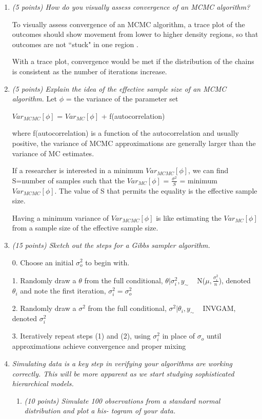 \documentclass{article}\usepackage[]{graphicx}\usepackage[]{color}
\begin{document}
\begin{enumerate}
\item %
{\it (5 points) How do you visually assess convergence of an MCMC algorithm?}

To visually assess convergence of an MCMC algorithm, a trace plot of the outcomes should show movement from lower to higher density regions, so that outcomes are not ``stuck" in one region .

With a trace plot, convergence would be met if the distribution of the chains is consistent as the number of iterations increase.

\item %
{\it (5 points) Explain the idea of the effective sample size of an MCMC algorithm.}
Let $\phi$ = the variance of the parameter set

$Var_{MCMC}[\phi]$ = $Var_{MC}[\phi]$ + f(autocorrelation)

where f(autocorrelation) is a function of the autocorrelation and usually positive, the variance of MCMC approximations are generally larger than the variance of MC estimates.

If a researcher is interested in a minimum $Var_{MCMC}[\phi]$, we can find S=number of samples such that the $Var_{MC}[\phi]$ = $\frac{\sigma^2}{S}$ = minimum $Var_{MCMC}[\phi]$. The value of S that permits the equality is the effective sample size.

Having a minimum variance of $Var_{MCMC}[\phi]$ is like estimating the $Var_{MC}[\phi]$ from a sample size of the effective sample size.

\item %
{\it (15 points) Sketch out the steps for a Gibbs sampler algorithm.}

0. Choose an initial $\sigma_{o}^2$ to begin with.

1. Randomly draw a $\theta$ from the full conditional, $\theta|\sigma^2_{i}, y_{\sim}$ ~ N($\mu, \frac{\sigma_{i}^2}{n}$), denoted $\theta_{i}$ and note the first iteration, $\sigma^2_{i} = \sigma^2_{o}$

2.  Randomly draw a $\sigma^2$ from the full conditional, $\sigma^2|\theta_{i}, y_{\sim}$ ~ INVGAM, denoted $\sigma^2_{i}$

3. Iteratively repeat steps (1) and (2), using $\sigma^2_{i}$ in place of $\sigma_{o}$ until approximations achieve convergence and proper mixing

\item %
{\it Simulating data is a key step in verifying your algorithms are working correctly. This will be
more apparent as we start studying sophisticated hierarchical models.}
\begin{enumerate}
\item%
{\it (10 points) Simulate 100 observations from a standard normal distribution and plot a his-
togram of your data.}


\end{enumerate}
\end{enumerate}
\end{document}
